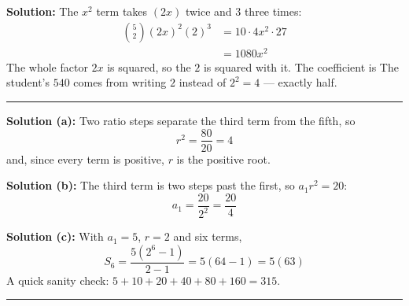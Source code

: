 \documentclass[12pt]{article}
\begin{document}
\textbf{Solution:} The $x^2$ term takes $(2x)$ twice and $3$ three times:
\begin{align*}
  \binom{5}{2}(2x)^2(2)^3 &= 10 \cdot 4x^2 \cdot 27 \\
                          &= 1080x^2
\end{align*}
The whole factor $2x$ is squared, so the $2$ is squared with it. The coefficient is
The student's $540$ comes from writing $2$ instead of $2^2 = 4$ --- exactly half.

\vspace{0.2cm}\noindent\rule{\linewidth}{0.2pt}


\textbf{Solution (a):} Two ratio steps separate the third term from the fifth, so
\[ r^2 = \frac{80}{20} = 4 \]
and, since every term is positive, $r$ is the positive root. 

\textbf{Solution (b):} The third term is two steps past the first, so $a_1 r^2 = 20$:
\[ a_1 = \frac{20}{2^2} = \frac{20}{4} \]

\textbf{Solution (c):} With $a_1 = 5$, $r = 2$ and six terms,
\[ S_6 = \frac{5(2^6 - 1)}{2 - 1} = 5(64 - 1) = 5(63) \]
A quick sanity check: $5 + 10 + 20 + 40 + 80 + 160 = 315$.

\vspace{0.2cm}\noindent\rule{\linewidth}{0.2pt}
\end{document}
